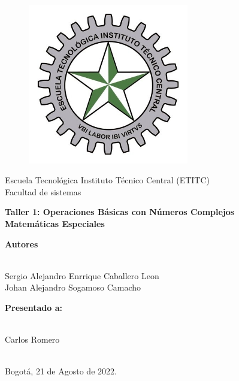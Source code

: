 \documentclass[a4paper,11pt,openany]{book}
\begin{document}
\begin{titlepage}
 
\begin{center}
\vspace*{-1in}
\begin{figure}[htb]
\begin{center}
\includegraphics[width=7cm]{ETITC.png}
\end{center}
\end{figure}
 
 
{\sc \huge Escuela Tecnológica Instituto Técnico Central (ETITC)}\\
\vspace*{0.15in}
Facultad de sistemas\\
\vspace*{0.6in}
\begin{Large}
\textbf{Taller 1: Operaciones Básicas con Números Complejos} \\
\textbf{Matem{\'a}ticas Especiales}\\
\end{Large}
\vspace*{0.3in}
\begin{large}
{\bf Autores} \\
 
\ 
 
Sergio Alejandro Enrrique Caballero Leon\\ 
Johan Alejandro Sogamoso Camacho \\ 
\end{large}
\vspace*{0.3in}
 
\end{center}
 
\begin{center}
{\bf Presentado a:} \\
 
\ 
 
Carlos Romero \\
 
\
 
Bogot{\'a}, 21 de Agosto de 2022.
\end{center}
 
\end{titlepage}
\end{document}
